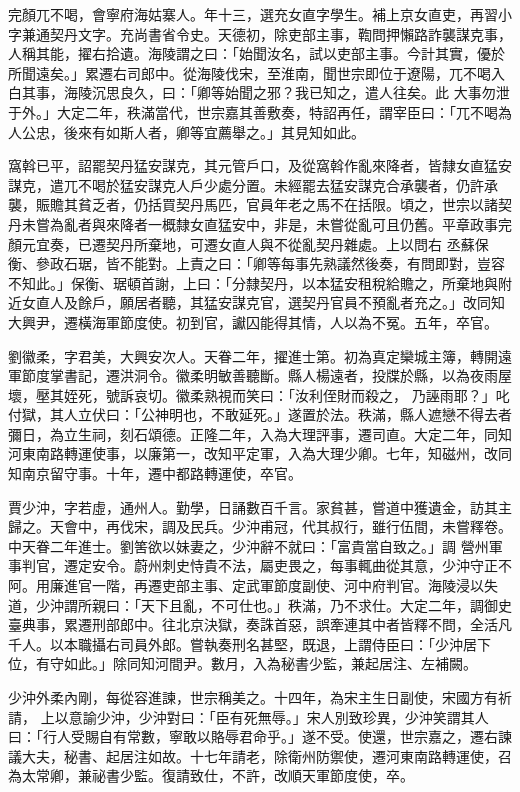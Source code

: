\begin{pinyinscope}
 完顏兀不喝，會寧府海姑寨人。年十三，選充女直字學生。補上京女直吏，再習小字兼通契丹文字。充尚書省令史。天德初，除吏部主事，鞫問押懶路詐襲謀克事，人稱其能，擢右拾遺。海陵謂之曰：「始聞汝名，試以吏部主事。今計其實，優於所聞遠矣。」累遷右司郎中。從海陵伐宋，至淮南，聞世宗即位于遼陽，兀不喝入白其事，海陵沉思良久，曰：「卿等始聞之邪？我已知之，遣人往矣。此
 大事勿泄于外。」大定二年，秩滿當代，世宗嘉其善敷奏，特詔再任，謂宰臣曰：「兀不喝為人公忠，後來有如斯人者，卿等宜薦舉之。」其見知如此。



 窩斡已平，詔罷契丹猛安謀克，其元管戶口，及從窩斡作亂來降者，皆隸女直猛安謀克，遣兀不喝於猛安謀克人戶少處分置。未經罷去猛安謀克合承襲者，仍許承襲，賑贍其貧乏者，仍括買契丹馬匹，官員年老之馬不在括限。頃之，世宗以諸契丹未嘗為亂者與來降者一概隸女直猛安中，非是，未嘗從亂可且仍舊。平章政事完顏元宜奏，已遷契丹所棄地，可遷女直人與不從亂契丹雜處。上以問右
 丞蘇保衡、參政石琚，皆不能對。上責之曰：「卿等每事先熟議然後奏，有問即對，豈容不知此。」保衡、琚頓首謝，上曰：「分隸契丹，以本猛安租稅給贍之，所棄地與附近女直人及餘戶，願居者聽，其猛安謀克官，選契丹官員不預亂者充之。」改同知大興尹，遷橫海軍節度使。初到官，讞囚能得其情，人以為不冤。五年，卒官。



 劉徽柔，字君美，大興安次人。天眷二年，擢進士第。初為真定欒城主簿，轉開遠軍節度掌書記，遷洪洞令。徽柔明敏善聽斷。縣人楊遠者，投牒於縣，以為夜雨屋壞，壓其姪死，號訴哀切。徽柔熟視而笑曰：「汝利侄財而殺之，
 乃誣雨耶？」叱付獄，其人立伏曰：「公神明也，不敢延死。」遂置於法。秩滿，縣人遮戀不得去者彌日，為立生祠，刻石頌德。正隆二年，入為大理評事，遷司直。大定二年，同知河東南路轉運使事，以廉第一，改知平定軍，入為大理少卿。七年，知磁州，改同知南京留守事。十年，遷中都路轉運使，卒官。



 賈少沖，字若虛，通州人。勤學，日誦數百千言。家貧甚，嘗道中獲遺金，訪其主歸之。天會中，再伐宋，調及民兵。少沖甫冠，代其叔行，雖行伍間，未嘗釋卷。中天眷二年進士。劉筈欲以妹妻之，少沖辭不就曰：「富貴當自致之。」調
 營州軍事判官，遷定安令。蔚州刺史恃貴不法，屬吏畏之，每事輒曲從其意，少沖守正不阿。用廉進官一階，再遷吏部主事、定武軍節度副使、河中府判官。海陵浸以失道，少沖謂所親曰：「天下且亂，不可仕也。」秩滿，乃不求仕。大定二年，調御史臺典事，累遷刑部郎中。往北京決獄，奏誅首惡，誤牽連其中者皆釋不問，全活凡千人。以本職攝右司員外郎。嘗執奏刑名甚堅，既退，上謂侍臣曰：「少沖居下位，有守如此。」除同知河間尹。數月，入為秘書少監，兼起居注、左補闕。



 少沖外柔內剛，每從容進諫，世宗稱美之。十四年，為宋主生日副使，宋國方有祈請，
 上以意諭少沖，少沖對曰：「臣有死無辱。」宋人別致珍異，少沖笑謂其人曰：「行人受賜自有常數，寧敢以賂辱君命乎。」遂不受。使還，世宗嘉之，遷右諫議大夫，秘書、起居注如故。十七年請老，除衛州防禦使，遷河東南路轉運使，召為太常卿，兼祕書少監。復請致仕，不許，改順天軍節度使，卒。




\end{pinyinscope}
